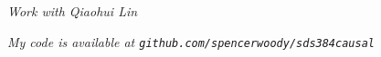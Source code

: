 \documentclass[11pt,letter]{article}
\begin{document}
\maketitle

\newpage


\emph{Work with Qiaohui Lin}

\emph{My code is available at
  \texttt{github.com/spencerwoody/sds384causal}}


















% 





% 
 




\begin{raggedright}

\end{raggedright}


\end{document}
